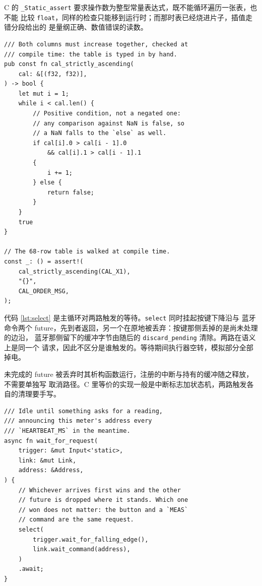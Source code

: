 \documentclass[12pt,a4paper]{article}
\newcommand{\wuhao}{\fontsize{10.5bp}{15bp}\selectfont}
\begin{document}
C 的 \texttt{\_Static\_assert} 要求操作数为整型常量表达式，既不能循环遍历一张表，也不能
比较 \texttt{float}，同样的检查只能移到运行时；而那时表已经烧进片子，插值走错分段给出的
是量纲正确、数值错误的读数。

\begin{lstlisting}[caption={\texttt{src/cal.rs}：标定表单调性的编译期校验},
  label={lst:calcheck},basicstyle=\codefont\wuhao,numberstyle=\codefont
  \fontsize{8bp}{15bp}\selectfont\color{black!45},xleftmargin=1.2em]
/// Both columns must increase together, checked at
/// compile time: the table is typed in by hand.
pub const fn cal_strictly_ascending(
    cal: &[(f32, f32)],
) -> bool {
    let mut i = 1;
    while i < cal.len() {
        // Positive condition, not a negated one:
        // any comparison against NaN is false, so
        // a NaN falls to the `else` as well.
        if cal[i].0 > cal[i - 1].0
            && cal[i].1 > cal[i - 1].1
        {
            i += 1;
        } else {
            return false;
        }
    }
    true
}

// The 68-row table is walked at compile time.
const _: () = assert!(
    cal_strictly_ascending(CAL_X1),
    "{}",
    CAL_ORDER_MSG,
);
\end{lstlisting}

代码 \ref{lst:select} 是主循环对两路触发的等待。\texttt{select} 同时挂起按键下降沿与
蓝牙命令两个 future，先到者返回，另一个在原地被丢弃：按键那侧丢掉的是尚未处理的边沿，
蓝牙那侧留下的缓冲字节由随后的 \texttt{discard\_pending} 清除。两路在语义上是同一个
请求，因此不区分是谁触发的。等待期间执行器空转，模拟部分全部掉电。

未完成的 future 被丢弃时其析构函数运行，注册的中断与持有的缓冲随之释放，不需要单独写
取消路径。C 里等价的实现一般是中断标志加状态机，两路触发各自的清理要手写。

\begin{lstlisting}[caption={\texttt{src/main.rs}：按键与蓝牙命令的两路等待},
  label={lst:select},basicstyle=\codefont\wuhao,numberstyle=\codefont
  \fontsize{8bp}{15bp}\selectfont\color{black!45},xleftmargin=1.2em]
/// Idle until something asks for a reading,
/// announcing this meter's address every
/// `HEARTBEAT_MS` in the meantime.
async fn wait_for_request(
    trigger: &mut Input<'static>,
    link: &mut Link,
    address: &Address,
) {
    // Whichever arrives first wins and the other
    // future is dropped where it stands. Which one
    // won does not matter: the button and a `MEAS`
    // command are the same request.
    select(
        trigger.wait_for_falling_edge(),
        link.wait_command(address),
    )
    .await;
}
\end{lstlisting}
\end{document}
